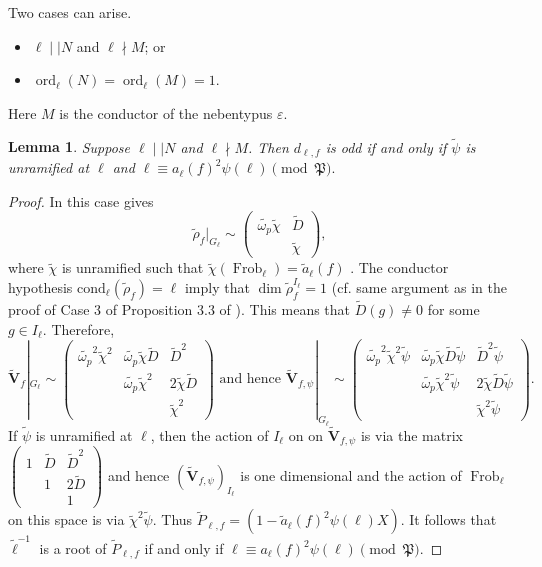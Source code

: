 \documentclass{amsart}
\newcommand{\bV}{\mathbf{V}}
\newcommand{\Frob}{\operatorname{Frob}}
\newcommand{\ord}{\operatorname{ord}}
\newtheorem{auxiliary proposition}[theorem]{Auxiliary Proposition}
\newtheorem{lemma}[theorem]{Lemma}
\newtheorem{main conjecture}[theorem]{Main Conjecture}
\newtheorem{main theorem}[theorem]{Main Theorem}
\newtheorem{modesty proposition}[theorem]{Modesty Proposition}
\newtheorem{open problem}[theorem]{Open Problem}
\newtheorem{convergence lemma}[theorem]{Convergence Lemma}
\newtheorem{corrected lemma}[theorem]{Corrected Lemma}
\newtheorem{growth lemma}[theorem]{Growth Lemma}
\newtheorem{coefficient lemma}[theorem]{Integrality Lemma}
\newtheorem{interpolation lemma}[theorem]{Interpolation Lemma}
\newtheorem{kernel lemma}[theorem]{Kernel Lemma}
\newtheorem{limit lemma}[theorem]{Limit Lemma}
\newtheorem{tandem lemma}[theorem]{Modesty Lemma}
\newtheorem{zero-finding lemma}[theorem]{Zero-Finding Lemma}
\begin{document}
\vspace{.2cm}
Two cases can arise.
\begin{itemize}
    \item $\ell \mid \mid N$ and $\ell \nmid M$; or
    \item $\ord_\ell(N)=\ord_\ell(M)=1$.
\end{itemize}
Here $M$ is the conductor of the nebentypus $\varepsilon$.


\begin{lemma}\label{lem: ii}
Suppose $\ell \mid \mid N$ and $\ell \nmid M$. Then $d_{\ell,f}$ is odd if and only if $\tilde{\psi}$ is unramified at $\ell$ and $\ell \equiv a_\ell(f)^2\psi(\ell) \pmod{\mathfrak{P}}.$
\end{lemma}
 \begin{proof}
In this case  \cite[Theorem 3.26, 3(b)]{HidabookModular} gives
$$\tilde{\rho}_f|_{G_\ell}\sim \begin{pmatrix}
\tilde{\omega_p}\tilde{\chi} & \tilde{D}\\
~ & \tilde{\chi}
\end{pmatrix},$$
where $\tilde{\chi}$ is unramified such that $\tilde{\chi}(\Frob_\ell)=\tilde{a}_\ell(f)$ . The conductor hypothesis  
$\mathrm{cond}_\ell(\tilde{\rho}_f)=\ell$ imply that $\dim \tilde{\rho}_f^{I_\ell}=1$ (cf. same argument as in the proof of Case 3 of Proposition 3.3 of \cite{JhaMajumdarShekhar}). This means that 
$\tilde{D}(g) \neq 0$  for some $g \in I_\ell$. Therefore,
$$\tilde{\bV}_f|_{G_\ell}\sim \begin{pmatrix}
\tilde{\omega_p}^2\tilde{\chi}^2 & \tilde{\omega_p}\tilde{\chi}\tilde{D} & \tilde{D}^2\\
~ & \tilde{\omega_p}\tilde{\chi}^2 & 2\tilde{\chi}\tilde{D}\\
~ & ~ & \tilde{\chi}^2
\end{pmatrix} 
\text{ and hence }
\tilde{\bV}_{f,\psi}|_{G_\ell}\sim \begin{pmatrix}
\tilde{\omega_p}^2\tilde{\chi}^2\tilde{\psi} & \tilde{\omega_p}\tilde{\chi}\tilde{D}\tilde{\psi} & \tilde{D}^2\tilde{\psi}\\
~ & \tilde{\omega_p}\tilde{\chi}^2\tilde{\psi} & 2\tilde{\chi}\tilde{D}\tilde{\psi}\\
~ & ~ & \tilde{\chi}^2\tilde{\psi}
\end{pmatrix}.$$
If $\tilde{\psi}$ is unramified at $\ell$, then
the action of $I_\ell$ on on $\tilde{\bV}_{f,\psi}$ is via the matrix 
$\begin{pmatrix}
1 & \tilde{D} & \tilde{D}^2\\
~ & 1 & 2\tilde{D}\\
~ & ~ & 1
\end{pmatrix}$
and hence $(\tilde{\bV}_{f,\psi})_{I_\ell}$ is one dimensional and the action of $\Frob_\ell$ on this space is via $\tilde{\chi}^2\tilde{\psi}$. Thus $\tilde{P}_{\ell,f}=(1-\tilde{a}_\ell(f)^2\psi(\ell)X)$. It follows that $\tilde{\ell}^{-1}$ is a root of $\tilde{P}_{\ell,f}$ if and only if $\ell \equiv a_\ell(f)^2\psi(\ell) \pmod{\mathfrak{P}}.$



\end{proof}
\end{document}
